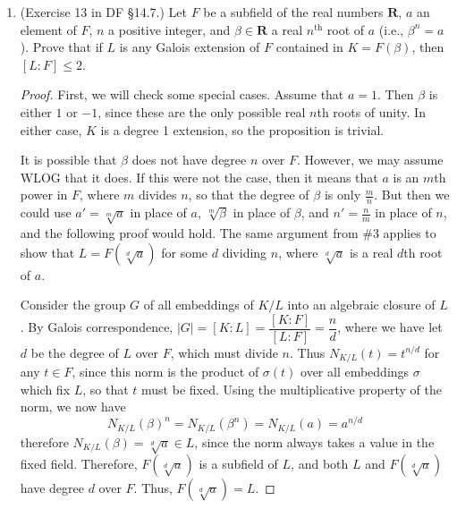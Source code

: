 \documentclass[10pt]{article}
\begin{document}
\begin{enumerate}
\begin{proof}
Now, $\sigma^{-1}$ is an embedding of $K$ into $L$.  Let $F$ be the image of $K$ under $\sigma^{-1}$.  Clearly, $[L:F] = [L:K] = p$.  We know that $\alpha \not \in F$, otherwise there would exist some $k \in K$ such that
$$
\alpha = \sigma^{-1}(k) \implies \sigma(\alpha) = k \in K,
$$
a contradiction.  Since $\alpha \not \in F$, we know that $F(\alpha) \subseteq L$ has degree greater than 1 over $F$.  Since its degree must divide $p$, it has degree $p$.  Therefore, $F(\alpha)$ must equal $L$, since the degree of $L$ over $F(\alpha)$ is $p$.
\end{proof}

\item (Exercise 13 in DF \S 14.7.) Let $F$ be a subfield of the real numbers $\mathbf{R}$, $a$ an element of $F$, $n$ a positive integer, and $\beta \in \mathbf{R}$ a real $n^\text{th}$ root of $a$ (i.e., $\beta^n=a$).  Prove that if $L$ is any Galois extension of $F$ contained in $K = F(\beta)$, then $[L:F] \leq 2$.

\begin{proof}
First, we will check some special cases.  Assume that $a = 1$.  Then $\beta$ is either $1$ or $-1$, since these are the only possible real $n$th roots of unity.  In either case, $K$ is a degree 1 extension, so the proposition is trivial.

It is possible that $\beta$ does not have degree $n$ over $F$.  However, we may assume WLOG that it does.  If this were not the case, then it means that $a$ is an $m$th power in $F$, where $m$ divides $n$, so that the degree of $\beta$ is only $\frac{m}{n}$.  But then we could use $a' = \sqrt[m]{a}$ in place of $a$, $\sqrt[m]{\beta}$ in place of $\beta$, and $n' = \frac{n}{m}$ in place of $n$, and the following proof would hold.  The same argument from \#3 applies to show that $L = F(\sqrt[d]{a})$ for some $d$ dividing $n$, where $\sqrt[d]{a}$ is a real $d$th root of $a$.

Consider the group $G$ of all embeddings of $K/L$ into an algebraic closure of $L$.  By Galois correspondence, $|G| = [K:L] = \dfrac{[K:F]}{[L:F]} = \dfrac{n}{d}$, where we have let $d$ be the degree of $L$ over $F$, which must divide $n$.  Thus $N_{K/L}(t) = t^{n/d}$ for any $t \in F$, since this norm is the product of $\sigma(t)$ over all embeddings $\sigma$ which fix $L$, so that $t$ must be fixed.  Using the multiplicative property of the norm, we now have
$$
N_{K/L}(\beta)^n = N_{K/L}(\beta^n) = N_{K/L}(a) = a^{n/d}
$$
therefore $N_{K/L}(\beta) = \sqrt[d]{a} \in L$, since the norm always takes a value in the fixed field.  Therefore, $F(\sqrt[d]{a})$ is a subfield of $L$, and both $L$ and $F(\sqrt[d]{a})$ have degree $d$ over $F$.  Thus, $F(\sqrt[d]{a}) = L$.


\end{proof}
\end{enumerate}
\end{document}
